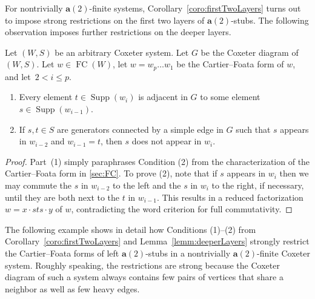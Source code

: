\documentclass[ALCO,Unicode,published]{cedram}
\newcommand{\la}{\mathbf{a}}
\DeclareMathOperator{\supp}{\mathrm{Supp}}
\DeclareMathOperator{\fc}{\mathrm{FC}}
\begin{document}
For nontrivially $\la(2)$-finite systems, Corollary~\ref{coro:firstTwoLayers} turns out to impose strong
restrictions on the first two layers of $\la(2)$-stubs.  The following observation imposes further
restrictions on the deeper layers. 

\begin{lemma}
    \label{lemm:deeperLayers}
    Let $(W,S)$ be an arbitrary Coxeter system. Let $G$ be the Coxeter diagram
    of $(W,S)$. Let $w\in \fc(W)$, let $w=w_p\dots w_1$ be the Cartier--Foata form of $w$, and let~$2<i\le p$. 
    \begin{enumerate}
        \item Every element $t\in \supp(w_i)$ is adjacent in $G$ to some element $s\in \supp(w_{i-1})$.  
        \item If $s,t\in S$ are generators connected by a simple edge in $G$ such that $s$ appears in $w_{i-2}$ and
             $w_{i-1}=t$, then $s$ does not appear in $w_i$.  
    \end{enumerate}
\end{lemma}

\begin{proof}
    Part~(1) simply paraphrases Condition (2) from the characterization of the Cartier--Foata form
    in \autoref{sec:FC}. To prove (2), note that if $s$ appears in $w_{i}$ then we may commute the
    $s$ in $w_{i-2}$ to the left and the $s$ in $w_i$ to the right, if necessary, until they are
    both next to the $t$ in $w_{i-1}$. This results in a reduced factorization $w=x \cdot sts\cdot
    y$ of $w$, contradicting the word criterion for full commutativity. 
\end{proof}

The following example shows in detail how Conditions (1)--(2) from Corollary~\ref{coro:firstTwoLayers} and
Lemma~\ref{lemm:deeperLayers} strongly restrict the Cartier--Foata forms of left $\la(2)$-stubs in a
nontrivially $\la(2)$-finite Coxeter system.  Roughly speaking, the restrictions are strong because
the Coxeter diagram of such a system always contains few pairs of vertices that share a neighbor as
well as few heavy edges.
\end{document}
